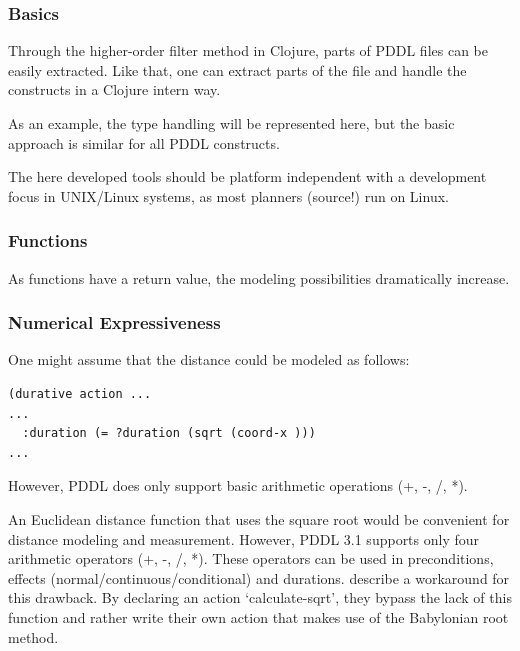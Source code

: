 \documentclass[11pt]{article}
\begin{document}
\subsubsection{Basics}
\label{sec-4-3-1}
Through the higher-order filter method in Clojure, parts of PDDL files
can be easily extracted. Like that, one can extract parts of the file
and handle the constructs in a Clojure intern way.

As an example, the type handling will be represented here, but the
basic approach is similar for all PDDL constructs.

The here developed tools should be platform independent with a
development focus in UNIX/Linux systems, as most planners (source!)
run on Linux.
\subsubsection{Functions}
\label{sec-4-3-2}
As functions have a return value, the modeling possibilities
dramatically increase.

\subsubsection{Numerical Expressiveness}
\label{sec-4-3-3}
One might assume that the distance could be modeled as follows:

\begin{verbatim}
(durative action ...
...
  :duration (= ?duration (sqrt (coord-x )))
...
\end{verbatim}

However, PDDL does only support basic arithmetic operations (+, -, /, *).

An Euclidean distance function that uses the square root would be
convenient for distance modeling and measurement. However, PDDL 3.1
supports only four arithmetic operators (+, -, /, *). These
operators can be used in preconditions, effects
(normal/continuous/conditional) and durations.
\textcite{parkinson2012increasing} describe a workaround for this
drawback. By declaring an action `calculate-sqrt', they bypass the
lack of this function and rather write their own action that makes use
of the Babylonian root method.
\end{document}
